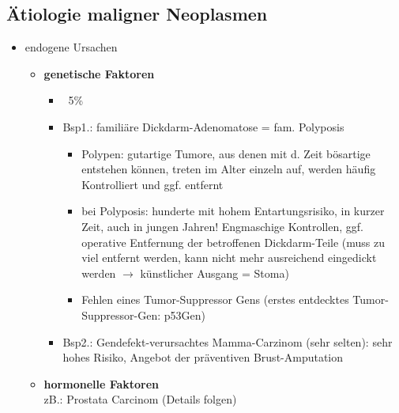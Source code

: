	\subsection*{Ätiologie maligner Neoplasmen}
		\begin{itemize}
			\item endogene Ursachen
				\begin{itemize}
					\item \textbf{genetische Faktoren}
						\begin{itemize}
							\item ~5\% 
							\item Bsp1.: familiäre Dickdarm-Adenomatose = fam. Polyposis
								\begin{itemize}
									\item Polypen: gutartige Tumore, aus denen mit d. Zeit bösartige 
										entstehen können, treten im Alter einzeln auf,
										werden häufig Kontrolliert und ggf. entfernt
									\item bei Polyposis: hunderte mit hohem Entartungsrisiko, in kurzer Zeit, auch in jungen Jahren! Engmaschige Kontrollen, ggf. operative Entfernung der betroffenen Dickdarm-Teile (muss zu viel entfernt werden, kann nicht mehr ausreichend eingedickt werden $\rightarrow$ künstlicher Ausgang = Stoma) 
									\item Fehlen eines Tumor-Suppressor Gens (erstes entdecktes Tumor-Suppressor-Gen: p53Gen)
								\end{itemize}
							\item Bsp2.: Gendefekt-verursachtes Mamma-Carzinom (sehr selten): sehr hohes Risiko, Angebot der präventiven Brust-Amputation
						\end{itemize}
					\item  \textbf{hormonelle Faktoren} \\
						zB.: Prostata Carcinom (Details folgen)
						

\end{itemize}
\end{itemize}
